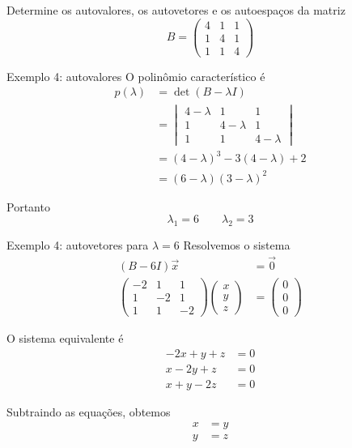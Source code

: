 \begin{question}
    Determine os autovalores, os autovetores e os autoespaços da matriz
    \[
        B=
        \begin{pmatrix}
            4 & 1 & 1\\
            1 & 4 & 1\\
            1 & 1 & 4
        \end{pmatrix}
    \]
\end{question}

\begin{resolution}{Exemplo 4: autovalores}
    O polinômio característico é
    \begin{align*}
        p(\lambda)
        &=\det(B-\lambda I)\\
        &=
        \begin{vmatrix}
            4-\lambda & 1 & 1\\
            1 & 4-\lambda & 1\\
            1 & 1 & 4-\lambda
        \end{vmatrix}\\
        &=(4-\lambda)^3-3(4-\lambda)+2\\
        &=(6-\lambda)(3-\lambda)^2
    \end{align*}

    Portanto
    \[
        \lambda_{1}=6
        \qquad
        \lambda_{2}=3
    \]
\end{resolution}

\begin{resolution}{Exemplo 4: autovetores para $\lambda=6$}
    Resolvemos o sistema
    \begin{align*}
        (B-6I)\vec{x}&=\vec{0}\\
        \begin{pmatrix}
            -2 & 1 & 1\\
            1 & -2 & 1\\
            1 & 1 & -2
        \end{pmatrix}
        \begin{pmatrix}
            x\\y\\z
        \end{pmatrix}
        &=
        \begin{pmatrix}
            0\\0\\0
        \end{pmatrix}
    \end{align*}

    O sistema equivalente é
    \begin{align*}
        -2x+y+z&=0\\
        x-2y+z&=0\\
        x+y-2z&=0
    \end{align*}

    Subtraindo as equações, obtemos
    \begin{align*}
        x&=y\\
        y&=z
    \end{align*}
\end{resolution}

